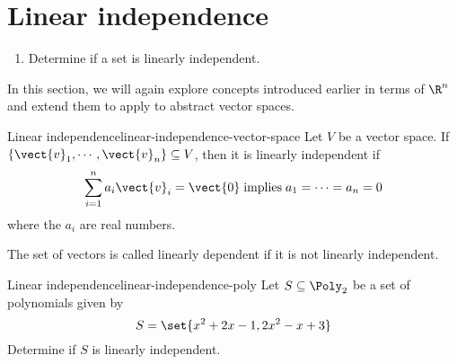 \section{Linear independence}

\begin{outcome}
  \begin{enumerate}
  \item Determine if a set is linearly independent.
  \end{enumerate}
\end{outcome}

In this section, we will again explore concepts introduced earlier in terms of $\R^n$ and extend them to apply to abstract vector spaces. 

\begin{definition}{Linear independence}{linear-independence-vector-space}
Let $V$ be a vector space. If $\{\vect{v}_{1},\cdots ,\vect{v}_{n}\} \subseteq V$, then it is linearly independent
 if
\begin{equation*}
\sum_{i=1}^{n}a_{i}\vect{v}_{i}=\vect{0} \;\mbox{implies}\;
a_{1}=\cdots =a_{n}=0
\end{equation*}
where the $a_i$ are real numbers. 
\end{definition}

The
set of vectors is called linearly dependent if it is not linearly independent.

\begin{example}{Linear independence}{linear-independence-poly}
Let $S \subseteq \Poly_2$ be a set of polynomials given by
\[
S = \set{x^2 + 2x - 1, 2x^2 - x + 3 }
\]
Determine if $S$ is linearly independent. 
\end{example}

